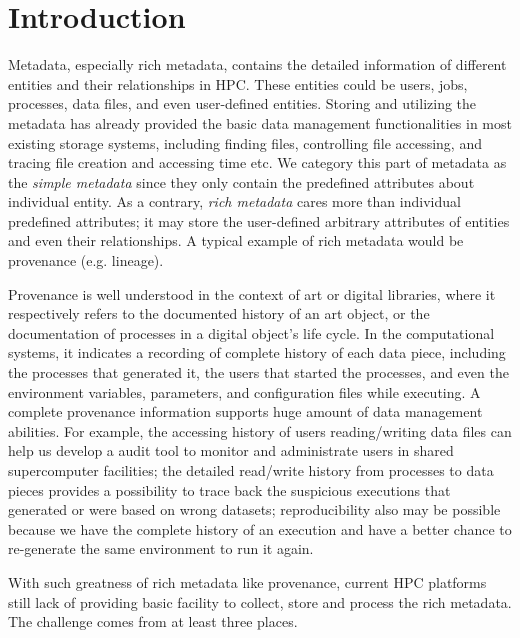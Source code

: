 \section{Introduction}

Metadata, especially rich metadata, contains the detailed information of different entities and their relationships in HPC. These entities could be users, jobs, processes, data files, and even user-defined entities. Storing and utilizing the metadata has already provided the basic data management functionalities in most existing storage systems, including finding files, controlling file accessing, and tracing file creation and accessing time etc. We category this part of metadata as the \textit{simple metadata} since they only contain the predefined attributes about individual entity. As a contrary, \textit{rich metadata} cares more than individual predefined attributes; it may store the user-defined arbitrary attributes of entities and even their relationships. A typical example of rich metadata would be provenance (e.g. lineage). 

Provenance is well understood in the context of art or digital libraries, where it respectively refers to the documented history of an art object, or the documentation of processes in a digital object's life cycle. In the computational systems, it indicates a recording of complete history of each data piece, including the processes that generated it, the users that started the processes, and even the environment variables, parameters, and configuration files while executing. A complete provenance information supports huge amount of data management abilities. For example, the  accessing history of users reading/writing data files can help us develop a audit tool to monitor and administrate users in shared supercomputer facilities; the detailed read/write history from processes to data pieces provides a possibility to trace back the suspicious executions that generated or were based on wrong datasets; reproducibility also may be possible because we have the complete history of an execution and have a better chance to re-generate the same environment to run it again. 

With such greatness of rich metadata like provenance, current HPC platforms still lack of providing basic facility to collect, store and process the rich metadata. The challenge comes from at least three places.

